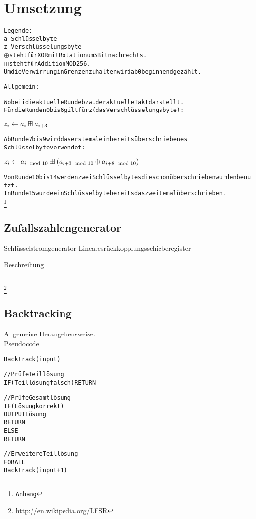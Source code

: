 \documentclass[a4paper,12pt]{article}
\begin{document}
\section{Umsetzung}

\begin{alltt}
Legende:
a - Schlüsselbyte
z - Verschlüsselungsbyte
\( \oplus \) steht für XOR mit Rotation um 5 Bit nach rechts.
\( \boxplus \) steht für Addition MOD 256.
Um die Verwirrung in Grenzen zu halten wird ab 0 beginnend gezählt.

Allgemein:

Wobei i die aktuelle Runde bzw. der aktuelle Takt darstellt.
Für die Runden 0 bis 6 gilt für z (das Verschlüsselungsbyte):

\( z\sb{i} \leftarrow a\sb{i} \boxplus a\sb{i+3} \)

Ab Runde 7 bis 9 wird das erste mal ein bereits überschriebenes 
Schlüsselbyte verwendet:

\( z\sb{i} \leftarrow a\sb{i \mod 10} \boxplus (a\sb{i+3 \mod 10} \oplus a\sb{i+8 \mod 10}) \)

Von Runde 10 bis 14 werden zwei Schlüsselbytes die schon überschrieben wurden benutzt.
In Runde 15 wurde ein Schlüsselbyte bereits das zweite mal überschrieben.
\footnote{Anhang}
\end{alltt}

\subsection{Zufallszahlengenerator}

Schlüsselstromgenerator
Linearesrückkopplungsschieberegister

Beschreibung

\begin{verbatim}

\end{verbatim}

\footnote{http://en.wikipedia.org/LFSR}

\subsection{Backtracking}

Allgemeine Herangehensweise: \\
Pseudocode

\begin{alltt}
Backtrack(input) {

    //Prüfe Teillösung
    IF (Teillösung falsch) RETURN

    //Prüfe Gesamtlösung
    IF (Lösung korrekt) 
        OUTPUT Lösung
        RETURN
    ELSE 
        RETURN

    //Erweitere Teillösung
    FOR ALL
        Backtrack(input + 1)
}
\end{alltt}
\end{document}

